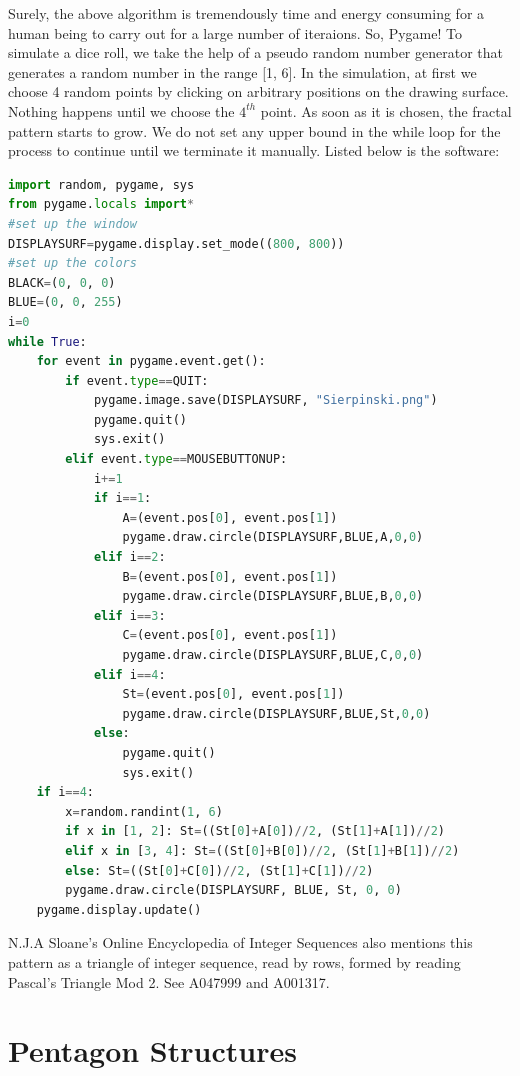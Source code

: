 \documentclass{article}
\begin{document}
Surely, the above algorithm is tremendously time and energy consuming for a human being to carry out for a large number of iteraions. So, Pygame! To simulate a dice roll, we take the help of a pseudo random number generator that generates a random number in the range [1, 6]. In the simulation, at first we choose 4 random points by clicking on arbitrary positions on the drawing surface. Nothing happens until we choose the $4^{th}$ point. As soon as it is chosen, the fractal pattern starts to grow. We do not set any upper bound in the while loop for the process to continue until we terminate it manually. Listed below is the software:
\begin{lstlisting}[language=Python, frame=single]
import random, pygame, sys
from pygame.locals import*
#set up the window
DISPLAYSURF=pygame.display.set_mode((800, 800))
#set up the colors
BLACK=(0, 0, 0)
BLUE=(0, 0, 255)
i=0
while True:
    for event in pygame.event.get():
        if event.type==QUIT:
            pygame.image.save(DISPLAYSURF, "Sierpinski.png")
            pygame.quit()
            sys.exit()
        elif event.type==MOUSEBUTTONUP:
            i+=1
            if i==1:
                A=(event.pos[0], event.pos[1])
                pygame.draw.circle(DISPLAYSURF,BLUE,A,0,0)
            elif i==2:
                B=(event.pos[0], event.pos[1])
                pygame.draw.circle(DISPLAYSURF,BLUE,B,0,0)
            elif i==3:
                C=(event.pos[0], event.pos[1])
                pygame.draw.circle(DISPLAYSURF,BLUE,C,0,0)
            elif i==4:
                St=(event.pos[0], event.pos[1])
                pygame.draw.circle(DISPLAYSURF,BLUE,St,0,0)
            else:
                pygame.quit()
                sys.exit()
    if i==4:
        x=random.randint(1, 6)
        if x in [1, 2]: St=((St[0]+A[0])//2, (St[1]+A[1])//2)
        elif x in [3, 4]: St=((St[0]+B[0])//2, (St[1]+B[1])//2)
        else: St=((St[0]+C[0])//2, (St[1]+C[1])//2)
        pygame.draw.circle(DISPLAYSURF, BLUE, St, 0, 0)
    pygame.display.update()
\end{lstlisting}

N.J.A Sloane's Online Encyclopedia of Integer Sequences also mentions this pattern as a triangle of integer sequence, read by rows, formed by reading Pascal's Triangle Mod 2. See A047999 and A001317.

\section{Pentagon Structures}
\end{document}
